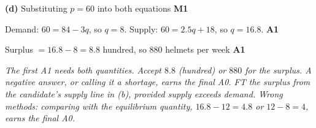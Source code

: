 \documentclass[12pt, twoside]{article}
\begin{document}
\begin{enumerate}[itemsep=0.3cm]
\textbf{(d)} Substituting $p = 60$ into both equations \hfill \textbf{M1}

Demand: $60 = 84 - 3q$, so $q = 8$. Supply: $60 = 2.5q + 18$, so
$q = 16.8$. \hfill \textbf{A1}

Surplus $= 16.8 - 8 = 8.8$ hundred, so $880$ helmets per week
\hfill \textbf{A1}

\emph{The first A1 needs both quantities. Accept $8.8$ (hundred) or $880$
for the surplus. A negative answer, or calling it a shortage, earns the
final A0. FT the surplus from the candidate's supply line in (b), provided
supply exceeds demand. Wrong methods: comparing with the equilibrium
quantity, $16.8 - 12 = 4.8$ or $12 - 8 = 4$, earns the final A0.}

\end{enumerate}
\end{document}
